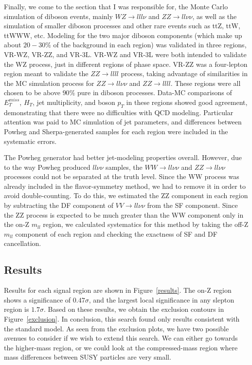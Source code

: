 Finally, we come to the section that I was responsible for, the Monte Carlo simulation of diboson events, mainly $WZ\rightarrow lll\nu$ and $ZZ\rightarrow ll\nu\nu$, as well as the simulation of smaller diboson processes and other rare events such as ttZ, ttW, ttWWW, etc. Modeling for the two major diboson components (which make up about $20-30\%$ of the background in each region) was validated in three regions, VR-WZ, VR-ZZ, and VR-3L. VR-WZ and VR-3L were both intended to validate the WZ process, just in different regions of phase space. VR-ZZ was a four-lepton region meant to validate the $ZZ\rightarrow llll$ process, taking advantage of similarities in the MC simulation process for $ZZ\rightarrow ll\nu\nu$ and $ZZ\rightarrow llll$. These regions were all chosen to be above $90\%$ pure in diboson processes. Data-MC comparisons of $E_T^{miss}$, $H_T$, jet multiplicity, and boson $p_T$ in these regions showed good agreement, demonstrating that there were no difficulties with QCD modeling. Particular attention was paid to MC simulation of jet parameters, and differences between Powheg and Sherpa-generated samples for each region were included in the systematic errors.

The Powheg generator had better jet-modeling properties overall. However, due to the way Powheg produced $ll\nu\nu$ samples, the $WW\rightarrow ll\nu\nu$ and $ZZ\rightarrow ll\nu\nu$ processes could not be separated at the truth level. Since the WW process was already included in the flavor-symmetry method, we had to remove it in order to avoid double-counting. To do this, we estimated the ZZ component in each region by subtracting the DF component of $VV\rightarrow ll\nu\nu$ from the SF component. Since the ZZ process is expected to be much greater than the WW component only in the on-Z $m_{ll}$ region, we calculated systematics for this method by taking the off-Z $m_{ll}$ component of each region and checking the exactness of SF and DF cancellation.

\subsection*{Results}

Results for each signal region are shown in Figure~\ref{results}. The on-Z region shows a significance of $0.47\sigma$, and the largest local significance in any slepton region is $1.7\sigma$. Based on these results, we obtain the exclusion contours in Figure~\ref{exclusion}. In conclusion, this search found only results consistent with the standard model. As seen from the exclusion plots, we have two possible avenues to consider if we wish to extend this search. We can either go towards the higher-mass region, or we could look at the compressed-mass region where mass differences between SUSY particles are very small.

